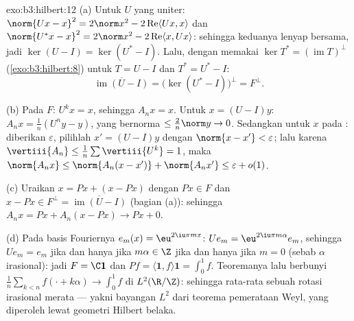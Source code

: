 \begin{solution}{exo:b3:hilbert:12}
(a) Untuk $U$ yang uniter: $\norm{Ux - x}^2 = 2\norm x^2 -
2\operatorname{Re}\langle Ux, x\rangle$ dan $\norm{U^*x -
x}^2 = 2\norm x^2 - 2\operatorname{Re}\langle x, Ux\rangle$:
sehingga keduanya lenyap bersama, jadi $\ker(U - I) = \ker(U^* - I)$.
Lalu, dengan memakai $\ker T^* = (\operatorname{im}T)^\perp$
(\cref{exo:b3:hilbert:8}) untuk $T = U - I$ dan $T^* = U^* -
I$:
\[
\overline{\operatorname{im}(U - I)} = \bigl(\ker(U^* -
I)\bigr)^\perp = F^\perp .
\]

(b) Pada $F$: $U^kx = x$, sehingga $A_nx = x$. Untuk $x = (U - I)y$:
$A_nx = \frac1n(U^ny - y)$, yang bernorma $\leq \frac2n\norm y \to
0$. Sedangkan untuk $x$ pada : diberikan $\varepsilon$, pilihlah $x' =
(U - I)y$ dengan $\norm{x - x'} < \varepsilon$; lalu karena
$\vertiii{A_n} \leq \frac1n\sum\vertiii{U^k} = 1$, maka
$\norm{A_nx} \leq \norm{A_n(x - x')} + \norm{A_nx'} \leq
\varepsilon + o(1)$.

(c) Uraikan $x = Px + (x - Px)$ dengan $Px \in F$ dan $x -
Px \in F^\perp = \overline{\operatorname{im}(U - I)}$ (bagian
(a)): sehingga $A_nx = Px + A_n(x - Px) \to Px + 0$.

(d) Pada basis Fouriernya $e_m(x) = \eu^{2\iu\pi mx}$: $Ue_m
= \eu^{2\iu\pi m\alpha}e_m$, sehingga $Ue_m = e_m$ jika dan hanya jika $m\alpha
\in \Z$ jika dan hanya jika $m = 0$ (sebab $\alpha$ irasional): jadi $F = \C\mathbf 1$
dan $Pf = \langle\mathbf 1, f\rangle\mathbf 1 = \int_0^1f$.
Teoremanya lalu berbunyi $\frac1n\sum_{k<n}f(\cdot + k\alpha) \to
\int_0^1f$ di $L^2(\R/\Z)$: sehingga rata-rata  sebuah
rotasi irasional merata --- yakni bayangan $L^2$ dari
teorema pemerataan Weyl, yang diperoleh lewat geometri Hilbert belaka.
\end{solution}

